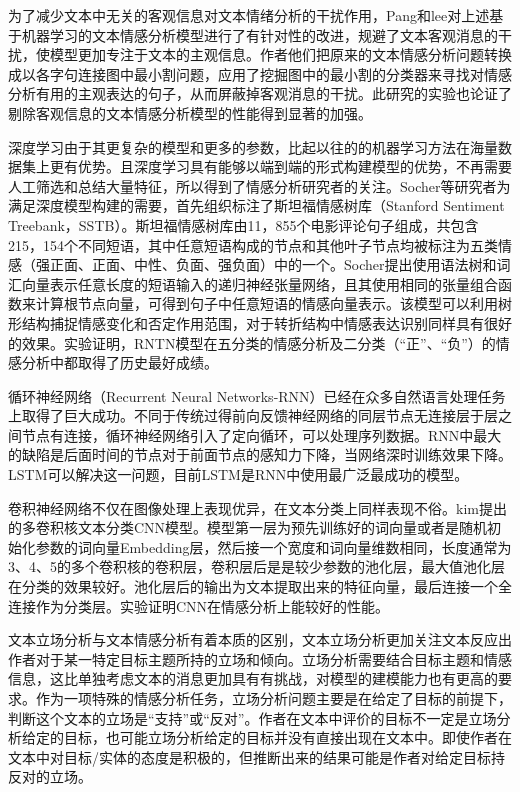 为了减少文本中无关的客观信息对文本情绪分析的干扰作用，Pang和lee对上述基于机器学习的文本情感分析模型进行了有针对性的改进，规避了文本客观消息的干扰，使模型更加专注于文本的主观信息。作者他们把原来的文本情感分析问题转换成以各字句连接图中最小割问题，应用了挖掘图中的最小割的分类器来寻找对情感分析有用的主观表达的句子，从而屏蔽掉客观消息的干扰。此研究的实验也论证了剔除客观信息的文本情感分析模型的性能得到显著的加强。


深度学习由于其更复杂的模型和更多的参数，比起以往的的机器学习方法在海量数据集上更有优势。且深度学习具有能够以端到端的形式构建模型的优势，不再需要人工筛选和总结大量特征，所以得到了情感分析研究者的关注。Socher等研究者为满足深度模型构建的需要，首先组织标注了斯坦福情感树库（Stanford Sentiment Treebank，SSTB）。斯坦福情感树库由11，855个电影评论句子组成，共包含215，154个不同短语，其中任意短语构成的节点和其他叶子节点均被标注为五类情感（强正面、正面、中性、负面、强负面）中的一个。Socher提出使用语法树和词汇向量表示任意长度的短语输入的递归神经张量网络，且其使用相同的张量组合函数来计算根节点向量，可得到句子中任意短语的情感向量表示。该模型可以利用树形结构捕捉情感变化和否定作用范围，对于转折结构中情感表达识别同样具有很好的效果。实验证明，RNTN模型在五分类的情感分析及二分类（“正”、“负”）的情感分析中都取得了历史最好成绩。

循环神经网络（Recurrent Neural Networks-RNN）已经在众多自然语言处理任务上取得了巨大成功。不同于传统过得前向反馈神经网络的同层节点无连接层于层之间节点有连接，循环神经网络引入了定向循环，可以处理序列数据。RNN中最大的缺陷是后面时间的节点对于前面节点的感知力下降，当网络深时训练效果下降。LSTM可以解决这一问题，目前LSTM是RNN中使用最广泛最成功的模型。

卷积神经网络不仅在图像处理上表现优异，在文本分类上同样表现不俗。kim提出的多卷积核文本分类CNN模型。模型第一层为预先训练好的词向量或者是随机初始化参数的词向量Embedding层，然后接一个宽度和词向量维数相同，长度通常为3、4、5的多个卷积核的卷积层，卷积层后是是较少参数的池化层，最大值池化层在分类的效果较好。池化层后的输出为文本提取出来的特征向量，最后连接一个全连接作为分类层。实验证明CNN在情感分析上能较好的性能。

文本立场分析与文本情感分析有着本质的区别，文本立场分析更加关注文本反应出作者对于某一特定目标主题所持的立场和倾向。立场分析需要结合目标主题和情感信息，这比单独考虑文本的消息更加具有有挑战，对模型的建模能力也有更高的要求。作为一项特殊的情感分析任务，立场分析问题主要是在给定了目标的前提下，判断这个文本的立场是“支持”或“反对”。作者在文本中评价的目标不一定是立场分析给定的目标，也可能立场分析给定的目标并没有直接出现在文本中。即使作者在文本中对目标/实体的态度是积极的，但推断出来的结果可能是作者对给定目标持反对的立场。


